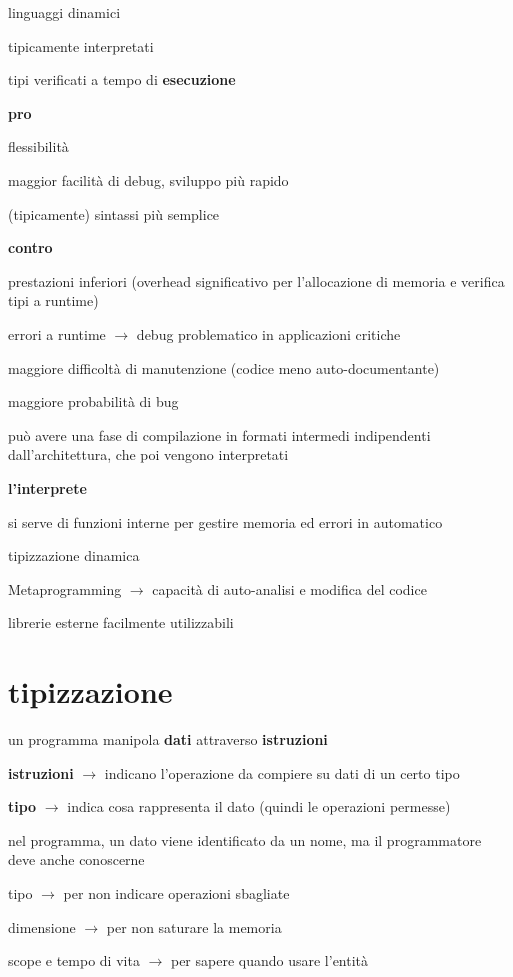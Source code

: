 linguaggi dinamici

tipicamente interpretati

tipi verificati a tempo di \textbf{esecuzione}

\textbf{pro}

flessibilit\`a

maggior facilit\`a di debug, sviluppo pi\`u rapido

(tipicamente) sintassi pi\`u semplice

\textbf{contro}

prestazioni inferiori (overhead significativo per l'allocazione di memoria e verifica tipi a runtime)

errori a runtime $\rightarrow$ debug problematico in applicazioni critiche

maggiore difficolt\`a di manutenzione (codice meno auto-documentante)

maggiore probabilit\`a di bug

pu\`o avere una fase di compilazione in formati intermedi indipendenti dall'architettura, che poi vengono interpretati

\textbf{l'interprete}

si serve di funzioni interne per gestire memoria ed errori in automatico

tipizzazione dinamica

Metaprogramming $\rightarrow$ capacit\`a di auto-analisi e modifica del codice

librerie esterne facilmente utilizzabili

\part{tipizzazione}

un programma manipola \textbf{dati} attraverso \textbf{istruzioni}

\textbf{istruzioni} $\rightarrow$ indicano l'operazione da compiere su dati di un certo tipo

\textbf{tipo} $\rightarrow$ indica cosa rappresenta il dato (quindi le operazioni permesse)

nel programma, un dato viene identificato da un nome, ma il programmatore deve anche conoscerne

tipo $\rightarrow$ per non indicare operazioni sbagliate

dimensione $\rightarrow$ per non saturare la memoria

scope e tempo di vita $\rightarrow$ per sapere quando usare l'entit\`a

